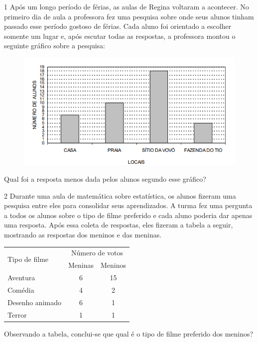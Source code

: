 
\num{1} Após um longo período de férias, as aulas de Regina voltaram a
acontecer. No primeiro dia de aula a professora fez uma pesquisa sobre
onde seus alunos tinham passado esse período gostoso de férias. Cada
aluno foi orientado a escolher somente um lugar e, após escutar todas as
respostas, a professora montou o seguinte gráfico sobre a pesquisa:

\begin{figure}[htpb!]
\includegraphics[width=.5\textwidth]{./imgs/mat11.png}
\end{figure}

Qual foi a resposta menos dada pelos alunos segundo esse gráfico?


\num{2} Durante uma aula de matemática sobre estatística, os alunos fizeram
uma pesquisa entre eles para consolidar seus aprendizados. A turma fez
uma pergunta a todos os alunos sobre o tipo de filme preferido e cada
aluno poderia dar apenas uma resposta. Após essa coleta de respostas,
eles fizeram a tabela a seguir, mostrando as respostas dos meninos e das meninas.

\begin{tabular}{l|cc}
\hline
\multirow{2}{*}{Tipo de filme} & \multicolumn{2}{c}{Número de votos} \\ \cline{2-3} 
 & \multicolumn{1}{c|}{Meninas} & Meninos \\ \hline
Aventura & \multicolumn{1}{c|}{6} & 15 \\ \hline
Comédia & \multicolumn{1}{c|}{4} & 2 \\ \hline
Desenho animado & \multicolumn{1}{c|}{6} & 1 \\ \hline
Terror & \multicolumn{1}{c|}{1} & 1 \\ \hline
\end{tabular}

Observando a tabela, conclui-se que qual é o tipo de filme preferido dos meninos?


